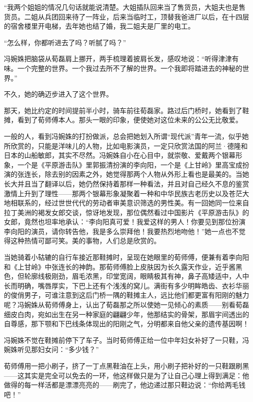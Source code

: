 \par “我两个姐姐的情况几句话就能说清楚。大姐插队回来当了售货员，大姐夫也是售货员。二姐从兵团回来待了一阵业，后来当临时工，顶替我爸进厂以后，在十四层的宿舍楼里开电梯，去年她也结了婚，我二姐夫是厂里的电工。
\par “怎么样，你都听进去了吗？听腻了吗？”
\par 冯婉姝把脑袋从荀磊肩上挪开，两手梳理着披肩长发，感叹地说：“听得津津有味。一个完整的世界。一个我过去所不了解的世界。一个我即将踏进去的神秘的世界。”
\par 不久，她的确迈步进入了这个世界。
\par 那天，她比约定的时间提前半小时，骑车前往荀磊家。路过后门桥时，她看到了鞋摊，看到了荀师傅本人。那头一眼的印象，便使她对这位未来的公公无比敬爱。
\par 一般的人，看到冯婉姝的打扮做派，总会把她划入所谓“现代派”青年一流，似乎她所欣赏的，只能是洋味儿的人物，比如电影演员，一定只欣赏法国的阿兰·德隆和日本的山船敏郎，其实不尽然。冯婉姝自小在心目中，就崇敬、爱戴两个银幕形象，一个是《平原游击队》里郭振清扮演的李向阳，一个是《上甘岭》里高宝成扮演的张连长，除去别的因素之外，她觉得那两个人物从外形上看也是最美的。当她长大并且当了翻译以后，她仍然保持着那样一种看法，并且对自己经久不息的鉴赏激情上升到了理性——那两个银幕形象凝聚着一种和中华民族古老历史以及苍茫大地相联系的，经过世世代代的劳动者审美意识筛选的男性美。有一回她同一位来自拉丁美洲的褐发女郎交谈，惊讶地发现，那位偶然看过中国影片《平原游击队》的女郎，竟然也坦率地承认：“李向阳真可爱！我爱这样的男人！你要见到那位扮演李向阳的演员，请你转告他，我是多么崇拜他！我要热烈地吻他！”她一点也不觉得这种热情可鄙可笑。美的事物，人们总是欣赏的。
\par 当她骑着小轱辘的自行车接近那鞋摊时，呈现在她眼里的荀师傅，便兼有着李向阳和《上甘岭》中张连长的神韵。那荀师傅脸上皮肤因为长久露天作业，近乎酱黑色，但轮廓线极刚劲，眉毛浓黑，印堂宽阔，眼睛极其有神，鼻子高矮适中，人中长而明确，嘴唇厚实，下巴上还有个浅浅的窝儿。满街有多少明眸皓齿、衣衫华丽的俊俏男子，可谁注意到这后门桥一隅的鞋摊主人，远比他们都更富有阳刚的魅力呢？冯婉姝从荀师傅身上，认出了荀磊那之所以使她一见倾心的素质——别看荀磊细皮白肉，宛如出生在另一种家庭的翩翩少年，他那结实的骨架，那眉宇间透出的自尊感，那下颚和下巴线条体现出的阳刚之气，分明都来自他父亲的遗传基因啊！
\par 冯婉姝不觉在鞋摊前停下了车子。当时荀师傅正给一位中年妇女补好了一只鞋，冯婉姝听见那妇女问：“多少钱？”
\par 荀师傅用一把小刷子，挤了一丁点黑鞋油在上头，用小刷子把补好的一只鞋跟刷黑——这其实是完全可以免去的一环，他这样做只是为了让自己心理上得到满足：他做得的每一样活都是漂漂亮亮的——刷完了，他边递过那只鞋边说：“你给两毛钱吧！”
